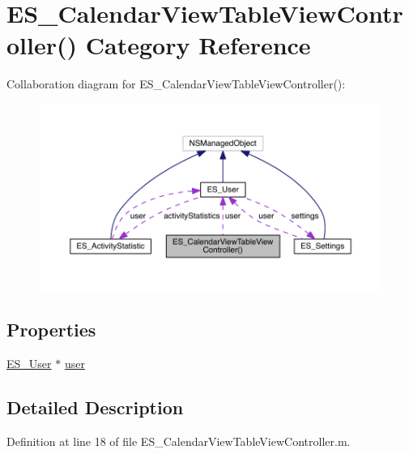 \hypertarget{category_e_s___calendar_view_table_view_controller_07_08}{\section{E\+S\+\_\+\+Calendar\+View\+Table\+View\+Controller() Category Reference}
\label{category_e_s___calendar_view_table_view_controller_07_08}
}


Collaboration diagram for E\+S\+\_\+\+Calendar\+View\+Table\+View\+Controller()\+:\nopagebreak
\begin{figure}[H]
\begin{center}
\leavevmode
\includegraphics[width=350pt]{d6/d52/category_e_s___calendar_view_table_view_controller_07_08__coll__graph}
\end{center}
\end{figure}
\subsection*{Properties}
\begin{DoxyCompactItemize}
\item 
\hyperlink{interface_e_s___user}{E\+S\+\_\+\+User} $\ast$ \hyperlink{category_e_s___calendar_view_table_view_controller_07_08_ad51ebca1237a8c0677b286bf1fbe832c}{user}
\end{DoxyCompactItemize}


\subsection{Detailed Description}


Definition at line 18 of file E\+S\+\_\+\+Calendar\+View\+Table\+View\+Controller.\+m.



